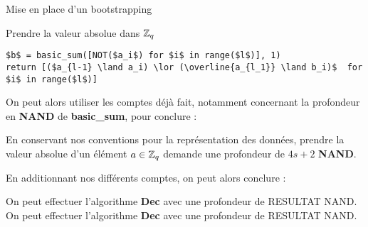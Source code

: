 \begin{section}{Mise en place d'un bootstrapping}
\begin{subsection}{Prendre la valeur absolue dans $\mathbb{Z}_q$}
\vspace{0.5cm}
\begin{lstlisting}
$b$ = basic_sum([NOT($a_i$) for $i$ in range($l$)], 1)
return [($a_{l-1} \land a_i) \lor (\overline{a_{l_1}} \land b_i)$  for $i$ in range($l$)]
\end{lstlisting}

	On peut alors utiliser les comptes déjà fait, notamment concernant la profondeur en \textbf{NAND} de \textbf{basic\_sum}, pour conclure :

\begin{prop}
	En conservant nos conventions pour la représentation des données, prendre la valeur absolue d'un élément $a\in \mathbb{Z}_q$ demande une profondeur de $4s + 2$ \textbf{NAND}.
\end{prop}
\end{subsection}

	En additionnant nos différents comptes, on peut alors conclure :

\begin{prop}
On peut effectuer l'algorithme \textbf{Dec} avec une profondeur de
RESULTAT NAND.
	On peut effectuer l'algorithme \textbf{Dec} avec une profondeur de RESULTAT NAND.
\end{prop}
	



\end{section}
